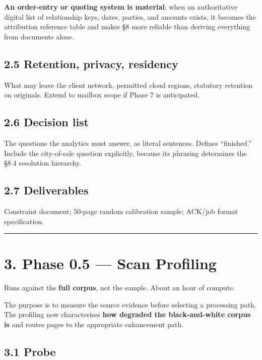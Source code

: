 \documentclass[
]{article}
\begin{document}
\textbf{An order-entry or quoting system is material}: when an
authoritative digital list of relationship keys, dates, parties, and
amounts exists, it becomes the attribution reference table and makes §8
more reliable than deriving everything from documents alone.

\subsection{2.5 Retention, privacy,
residency}\label{retention-privacy-residency}

What may leave the client network, permitted cloud regions, statutory
retention on originals. Extend to mailbox scope if Phase 7 is
anticipated.

\subsection{2.6 Decision list}\label{decision-list}

The questions the analytics must answer, as literal sentences. Defines
``finished.'' Include the city-of-sale question explicitly, because its
phrasing determines the §8.4 resolution hierarchy.

\subsection{2.7 Deliverables}\label{deliverables}

Constraint document; 50-page random calibration sample; ACK/job format
specification.

\begin{center}\rule{0.5\linewidth}{0.5pt}\end{center}

\section{3. Phase 0.5 --- Scan
Profiling}\label{phase-0.5-scan-profiling}

Runs against the \textbf{full corpus}, not the sample. About an hour of
compute.

The purpose is to measure the source evidence before selecting a
processing path. The profiling now characterises \textbf{how degraded
the black-and-white corpus is} and routes pages to the appropriate
enhancement path.

\subsection{3.1 Probe}\label{probe}
\end{document}
